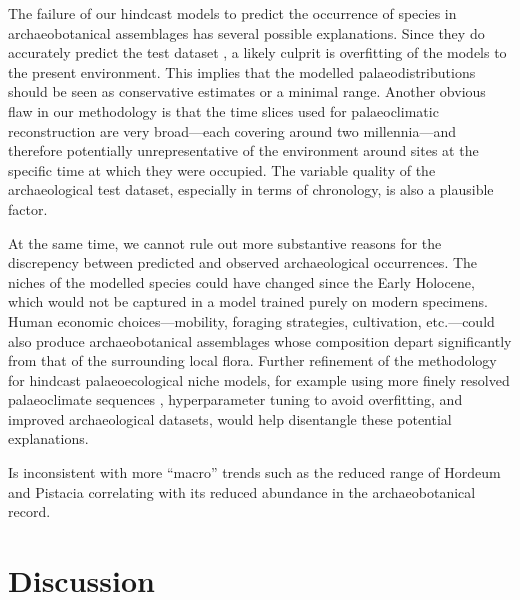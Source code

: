 \documentclass[
  authoryear,
  preprint]{elsarticle}
\begin{document}
The failure of our hindcast models to predict the occurrence of species
in archaeobotanical assemblages has several possible explanations. Since
they do accurately predict the test dataset , a likely culprit is
overfitting of the models to the present environment. This implies that
the modelled palaeodistributions should be seen as conservative
estimates or a minimal range. Another obvious flaw in our methodology is
that the time slices used for palaeoclimatic reconstruction are very
broad---each covering around two millennia---and therefore potentially
unrepresentative of the environment around sites at the specific time at
which they were occupied. The variable quality of the archaeological
test dataset, especially in terms of chronology, is also a plausible
factor.

At the same time, we cannot rule out more substantive reasons for the
discrepency between predicted and observed archaeological occurrences.
The niches of the modelled species could have changed since the Early
Holocene, which would not be captured in a model trained purely on
modern specimens. Human economic choices---mobility, foraging
strategies, cultivation, etc.---could also produce archaeobotanical
assemblages whose composition depart significantly from that of the
surrounding local flora. Further refinement of the methodology for
hindcast palaeoecological niche models, for example using more finely
resolved palaeoclimate sequences \citep[e.g.][]{KargerEtAl2023},
hyperparameter tuning to avoid overfitting, and improved archaeological
datasets, would help disentangle these potential explanations.

Is inconsistent with more ``macro'' trends such as the reduced range of
Hordeum and Pistacia correlating with its reduced abundance in the
archaeobotanical record.

\section{Discussion}\label{discussion}
\end{document}

